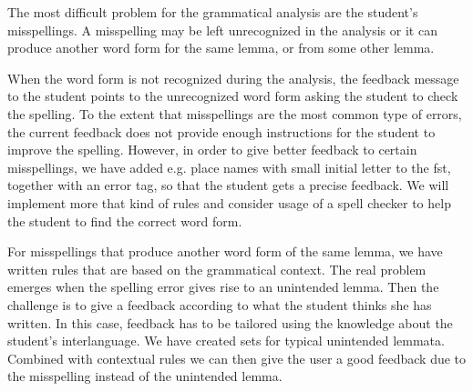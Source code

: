 \documentclass[11pt]{article}
\begin{document}
%

The most difficult problem for the grammatical analysis are the student's misspellings. A misspelling may be left unrecognized in the analysis or it can produce another word form for the same lemma, or from some other lemma. 

When the word form is not recognized during the analysis, the feedback message to the student points to the unrecognized word form asking the student to check the spelling. To the extent that misspellings are the most common type of errors, the current feedback does not provide enough instructions for the student to improve the spelling. However, in order to give better feedback to certain misspellings, we have added e.g. place names with small initial letter to the fst, together with an error tag, so that the student gets a precise feedback. We will implement more that kind of rules and consider usage of a spell checker to help the student to find the correct word form.


For misspellings that produce another word form of the same lemma, we have written rules that are based on the grammatical context. The real problem emerges when the spelling error gives rise to an unintended lemma. Then the challenge is to give a feedback according to what the student thinks she has written. In this case, feedback has to be tailored using the knowledge about the student’s interlanguage. We have created sets for typical unintended lemmata. Combined with contextual rules we can then give the user a good feedback due to the misspelling instead of the unintended lemma.
\end{document}
